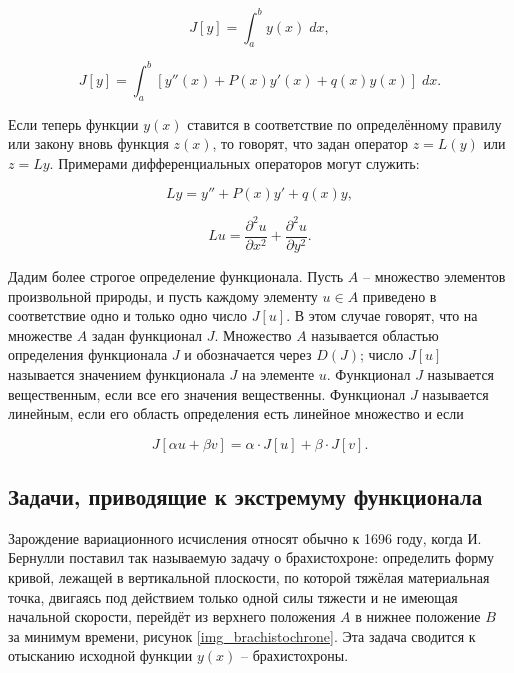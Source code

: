 \documentclass{article}
\begin{document}
\begin{equation}
	J[y] = \int_{a}^{b} y(x) \; dx,
\end{equation}

\begin{equation}
	J[y] = \int_{a}^{b} [y''(x) + P(x)y'(x) + q(x)y(x)] \;  dx.
\end{equation}

Если теперь функции $y(x)$ ставится в соответствие по определённому правилу или закону вновь функция $z(x)$, то говорят, что задан оператор $z = L(y)$ или $z = Ly$. Примерами дифференциальных операторов могут служить:

\begin{equation}
	Ly = y'' + P(x)y' + q(x)y,
\end{equation}

\begin{equation}
    Lu = \frac{\partial^2 u}{\partial x^2} + \frac{\partial^2 u}{\partial y^2}.
\end{equation}

Дадим более строгое определение функционала. Пусть $A$ – множество элементов произвольной природы, и пусть каждому элементу $u \in A$ приведено в соответствие одно и только одно число $J[u]$. В этом случае говорят, что на множестве $A$ задан функционал $J$. Множество $A$ называется областью определения функционала $J$ и обозначается через $D(J)$; число $J[u]$ называется значением функционала $J$ на элементе $u$. Функционал $J$ называется вещественным, если все его значения вещественны. Функционал $J$ называется линейным, если его область определения есть линейное множество и если

\begin{equation}
    J[\alpha u + \beta v] = \alpha \cdot J[u] + \beta \cdot J[v].
\end{equation}


\subsection{Задачи, приводящие к экстремуму функционала}

Зарождение вариационного исчисления относят обычно к 1696 году, когда И. Бернулли поставил так называемую задачу о брахистохроне: определить форму кривой, лежащей в вертикальной плоскости, по которой тяжёлая материальная точка, двигаясь под действием только одной силы тяжести и не имеющая начальной скорости, перейдёт из верхнего положения $A$ в нижнее положение $B$ за минимум времени, рисунок \ref{img_brachistochrone}. Эта задача сводится к отысканию исходной функции $y(x)$ – брахистохроны.
\end{document}
